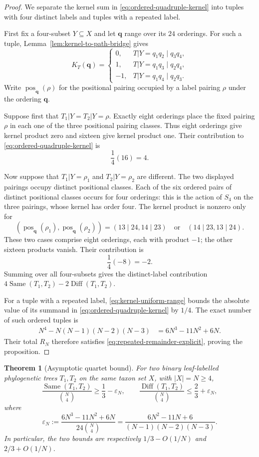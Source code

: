 \documentclass[11pt]{article}
\newtheorem{theorem}{Theorem}[section]
\newcommand{\Same}{\operatorname{Same}}
\newcommand{\Diff}{\operatorname{Diff}}
\begin{document}
\begin{proof}
We separate the kernel sum in \eqref{eq:ordered-quadruple-kernel} into tuples
with four distinct labels and tuples with a repeated label.

First fix a four-subset $Y\subseteq X$ and let $\boldsymbol q$ range over its
$24$ orderings.  For such a tuple, Lemma~\ref{lem:kernel-to-path-bridge}
gives
\[
K_T(\boldsymbol q)=
\begin{cases}
0,&T|Y=q_1q_2\mid q_3q_4,\\
1,&T|Y=q_1q_3\mid q_2q_4,\\
-1,&T|Y=q_1q_4\mid q_2q_3.
\end{cases}
\]
Write $\operatorname{pos}_{\boldsymbol q}(\rho)$ for the positional pairing
occupied by a label pairing $\rho$ under the ordering $\boldsymbol q$.

Suppose first that $T_1|Y=T_2|Y=\rho$.  Exactly eight orderings place the
fixed pairing $\rho$ in each one of the three positional pairing classes.
Thus eight orderings give kernel product zero and sixteen give kernel product
one.  Their contribution to \eqref{eq:ordered-quadruple-kernel} is
\[
 \frac14(16)=4.
\]

Now suppose that $T_1|Y=\rho_1$ and $T_2|Y=\rho_2$ are different.  The two
displayed pairings occupy distinct positional classes.  Each of the six
ordered pairs of distinct positional classes occurs for four orderings: this
is the action of $S_4$ on the three pairings, whose kernel has order four.
The kernel product is nonzero only for
\[
 (\operatorname{pos}_{\boldsymbol q}(\rho_1),
  \operatorname{pos}_{\boldsymbol q}(\rho_2))
 =(13\mid24,14\mid23)
 \quad\text{or}\quad
 (14\mid23,13\mid24).
\]
These two cases comprise eight orderings, each with product $-1$; the other
sixteen products vanish.  Their contribution is
\[
 \frac14(-8)=-2.
\]
Summing over all four-subsets gives the distinct-label contribution
$4\Same(T_1,T_2)-2\Diff(T_1,T_2)$.

For a tuple with a repeated label, \eqref{eq:kernel-uniform-range} bounds the
absolute value of its summand in
\eqref{eq:ordered-quadruple-kernel} by $1/4$.  The exact number of such
ordered tuples is
\begin{align*}
 N^4-N(N-1)(N-2)(N-3)
 &=6N^3-11N^2+6N.
\end{align*}
Their total $R_N$ therefore satisfies
\eqref{eq:repeated-remainder-explicit}, proving the proposition.
\end{proof}

\begin{theorem}[Asymptotic quartet bound]\label{thm:quartet-bound}
For two binary leaf-labelled phylogenetic trees $T_1,T_2$ on the same taxon
set $X$, with $|X|=N\ge4$,
\[
\frac{\Same(T_1,T_2)}{\binom N4}\ge \frac13-\varepsilon_N,
\qquad
\frac{\Diff(T_1,T_2)}{\binom N4}\le \frac23+\varepsilon_N,
\]
where
\[
\varepsilon_N
:=\frac{6N^3-11N^2+6N}{24\binom N4}
=\frac{6N^2-11N+6}{(N-1)(N-2)(N-3)}.
\]
In particular, the two bounds are respectively
$1/3-O(1/N)$ and $2/3+O(1/N)$.
\end{theorem}
\end{document}
